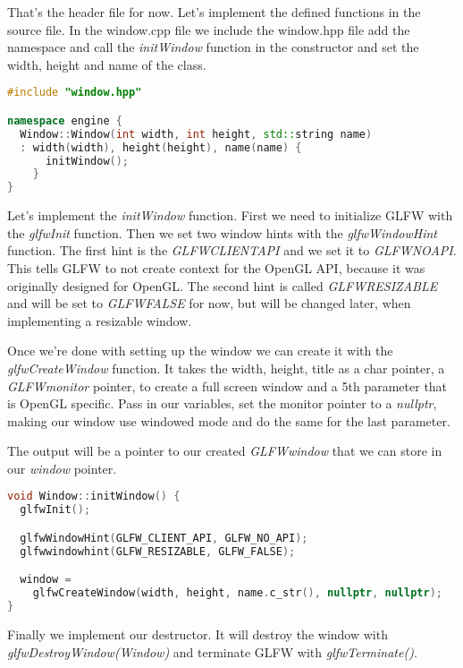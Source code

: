 \documentclass[12pt]{report} \usepackage{preamble}
\begin{document}
That's the header file for now. Let's implement the defined functions in the source file.
In the window.cpp file we include the window.hpp file add the namespace and
call the \textit{initWindow} function in the constructor and set the width, height and name of the class.

\begin{lstlisting}[language=C++]
#include "window.hpp"

namespace engine {
  Window::Window(int width, int height, std::string name)
  : width(width), height(height), name(name) {
      initWindow();
    }
}
\end{lstlisting}

Let's implement the \textit{initWindow} function. First we need to initialize \ac{GLFW} with the
\textit{glfwInit} function. Then we set two window hints with the \textit{glfwWindowHint} function.
The first hint is the \textit{GLFW\textunderscore CLIENT\textunderscore API} and we set it to
\textit{GLFW\textunderscore NO\textunderscore API}. This tells
\ac{GLFW} to not create context for the OpenGL \ac{API}, because it was originally designed for OpenGL. \cite{client-api-hint}
The second hint is called \textit{GLFW\textunderscore RESIZABLE} and will be set to \textit{GLFW\textunderscore FALSE}
for now, but will be changed later, when implementing a resizable window.

Once we're done with setting up the window we can create it with the \textit{glfwCreateWindow} function.
It takes the width, height, title as a char pointer, a \textit{GLFWmonitor} pointer, to create a full screen
window and a 5th parameter that is OpenGL specific. Pass in our variables, set the monitor pointer to a
\textit{nullptr}, making our window use windowed mode and do the same for the last parameter.

The output will be a pointer to our created \textit{GLFWwindow} that we can store in our \textit{window}
pointer.

\begin{lstlisting}[language=C++] 
void Window::initWindow() {
  glfwInit();

  glfwWindowHint(GLFW_CLIENT_API, GLFW_NO_API);
  glfwwindowhint(GLFW_RESIZABLE, GLFW_FALSE);

  window = 
    glfwCreateWindow(width, height, name.c_str(), nullptr, nullptr);
}
\end{lstlisting}

Finally we implement our destructor. It will destroy the window with \textit{glfwDestroyWindow(Window)}
and terminate \ac{GLFW} with \textit{glfwTerminate()}.
\end{document}
